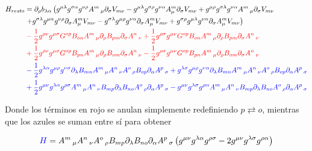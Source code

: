 \documentclass{article}
\numberwithin{equation}{section}
\begin{document}
\begin{equation}
\begin{aligned}
H_{resto}&= \partial_{\rho}{b_{\lambda \alpha}} \left( g^{\mu \lambda} g^{\sigma \alpha} g^{\nu \rho} A^{m}\,_{\mu} \partial_{\sigma}{V_{m \nu}} -g^{\mu \lambda} g^{\sigma \rho} g^{\nu \alpha} A^{m}_{\mu} \partial_{\sigma}{V_{m \nu}}+g^{\mu \rho} g^{\sigma \lambda} g^{\nu \alpha} A^{m}\,_{\mu} \partial_{\sigma}{V_{m \nu}} \right.\\
& \left. +g^{\sigma \lambda} g^{\mu \alpha} g^{\nu \rho} \partial_{\sigma}{A^{m}_{\mu}} V_{m \nu} -g^{\sigma \lambda} g^{\mu \rho} g^{\nu \alpha} \partial_{\sigma}{A^{m}_{\mu}} V_{m \nu}+g^{\sigma \rho} g^{\mu \lambda} g^{\nu \alpha} \partial_{\sigma}{A^{m}_{\mu}} V_{m \nu} \right)\\
&\color{red} -\frac{1}{2} g^{\rho \nu} g^{\mu \sigma} G^{o p} B_{o n} A^{m}\,_{\mu} \partial_{\rho}{B_{p m}} \partial_{\sigma}{A^{n}\,_{\nu}} + \frac{1}{2} g^{\rho \sigma} g^{\mu \nu} G^{o p} B_{o n} A^{m}\,_{\mu} \partial_{\rho}{B_{p m}} \partial_{\sigma}{A^{n}\,_{\nu}}\\
&\color{red}+ \frac{1}{2} g^{\rho \nu} g^{\mu \sigma} G^{o p} B_{p n} A^{m}\,_{\mu} \partial_{\rho}{B_{o m}} \partial_{\sigma}{A^{n}\,_{\nu}} - \frac{1}{2}g^{\rho \sigma} g^{\mu \nu} G^{o p} B_{p n} A^{m}\,_{\mu}  \partial_{\rho}{B_{o m}} \partial_{\sigma}{A^{n}\,_{\nu}}\\
&\color{blue}- \frac{1}{2}g^{\lambda \alpha} g^{\mu \rho} g^{\nu \sigma} \partial_{\lambda}{B_{m n}} A^{m}\,_{\mu} A^{n}\,_{\nu} A^{o}\,_{\rho} B_{o p} \partial_{\alpha}{A^{p}\,_{\sigma}}+g^{\lambda \sigma} g^{\mu \rho} g^{\nu \alpha} \partial_{\lambda}{B_{m n}} A^{m}\,_{\mu} A^{n}\,_{\nu} A^{o}\,_{\rho} B_{o p} \partial_{\alpha}{A^{p}\,_{\sigma}}\\
&\color{blue} + \frac{1}{2}g^{\mu \nu} g^{\lambda \alpha} g^{\rho \sigma} A^{m}\,_{\mu} A^{n}\,_{\nu} B_{m p} \partial_{\lambda}{B_{n o}} A^{o}\,_{\rho} \partial_{\alpha}{A^{p}\,_{\sigma}} - g^{\mu \nu} g^{\lambda \sigma} g^{\rho \alpha} A^{m}\,_{\mu} A^{n}\,_{\nu} B_{m p} \partial_{\lambda}{B_{n o}} A^{o}\,_{\rho} \partial_{\alpha}{A^{p}\,_{\sigma}}\\
\end{aligned}
\end{equation}

Donde los términos en rojo se anulan simplemente redefiniendo $ p \rightleftarrows o $, mientras que los azules se suman entre sí para obtener

\begin{equation}
\textcolor{blue}{H} = A^{m}\,_{\mu} A^{n}\,_{\nu} A^{o}\,_{\rho}  B_{m p} \partial_{\lambda}{B_{n o}} \partial_{\alpha}{A^{p}\,_{\sigma}}  \left( g^{\mu \nu} g^{\lambda \alpha} g^{\rho \sigma}  - 2 g^{\mu \nu} g^{\lambda \sigma} g^{\rho \alpha} \right)
\end{equation}
\end{document}

